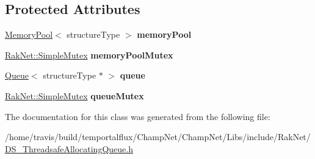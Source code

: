 \subsection*{Protected Attributes}
\begin{DoxyCompactItemize}
\item 
\hypertarget{class_data_structures_1_1_threadsafe_allocating_queue_ad03957d4e81bbe15a87872844fa766f6}{\hyperlink{class_data_structures_1_1_memory_pool}{Memory\-Pool}$<$ structure\-Type $>$ {\bfseries memory\-Pool}}\label{class_data_structures_1_1_threadsafe_allocating_queue_ad03957d4e81bbe15a87872844fa766f6}

\item 
\hypertarget{class_data_structures_1_1_threadsafe_allocating_queue_a299a4e4656551dad54609a7f6cf2052b}{\hyperlink{class_rak_net_1_1_simple_mutex}{Rak\-Net\-::\-Simple\-Mutex} {\bfseries memory\-Pool\-Mutex}}\label{class_data_structures_1_1_threadsafe_allocating_queue_a299a4e4656551dad54609a7f6cf2052b}

\item 
\hypertarget{class_data_structures_1_1_threadsafe_allocating_queue_ae89e097ad6d19614990c8566a55ec7a7}{\hyperlink{class_data_structures_1_1_queue}{Queue}$<$ structure\-Type $\ast$ $>$ {\bfseries queue}}\label{class_data_structures_1_1_threadsafe_allocating_queue_ae89e097ad6d19614990c8566a55ec7a7}

\item 
\hypertarget{class_data_structures_1_1_threadsafe_allocating_queue_ad77392386453ce0a79db5e49b3f4c8ba}{\hyperlink{class_rak_net_1_1_simple_mutex}{Rak\-Net\-::\-Simple\-Mutex} {\bfseries queue\-Mutex}}\label{class_data_structures_1_1_threadsafe_allocating_queue_ad77392386453ce0a79db5e49b3f4c8ba}

\end{DoxyCompactItemize}


The documentation for this class was generated from the following file\-:\begin{DoxyCompactItemize}
\item 
/home/travis/build/temportalflux/\-Champ\-Net/\-Champ\-Net/\-Libs/include/\-Rak\-Net/\hyperlink{_d_s___threadsafe_allocating_queue_8h}{D\-S\-\_\-\-Threadsafe\-Allocating\-Queue.\-h}\end{DoxyCompactItemize}
